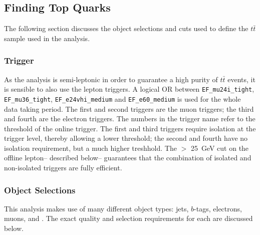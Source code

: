 	\subsection{Finding Top Quarks}

	The following section discusses the object selections and cuts used to define the $t\bar{t}$ sample used in the analysis.

	\subsubsection{Trigger}

	As the analysis is semi-leptonic in order to guarantee a high purity of $t\bar{t}$ events, it is sensible to also use the lepton triggers. A logical OR between {\tt EF\_mu24i\_tight}, {\tt EF\_mu36\_tight}, {\tt EF\_e24vhi\_medium} and {\tt EF\_e60\_medium} is used for the whole data taking period. The first and second triggers are the muon triggers; the third and fourth are the electron triggers. The numbers in the trigger name refer to the \pt threshold of the online trigger. The first and third triggers require isolation at the trigger level, thereby allowing a lower \pt threshold; the second and fourth have no isolation requirement, but a much higher \pt treshhold. The \pt $>$ 25~GeV cut on the offline lepton-- described below-- guarantees that the combination of isolated and non-isolated triggers are fully efficient.

	\subsubsection{Object Selections}

	This analysis makes use of many different object types: jets, $b$-tags, electrons, muons, and \met. The exact quality and selection requirements for each are discussed below.

